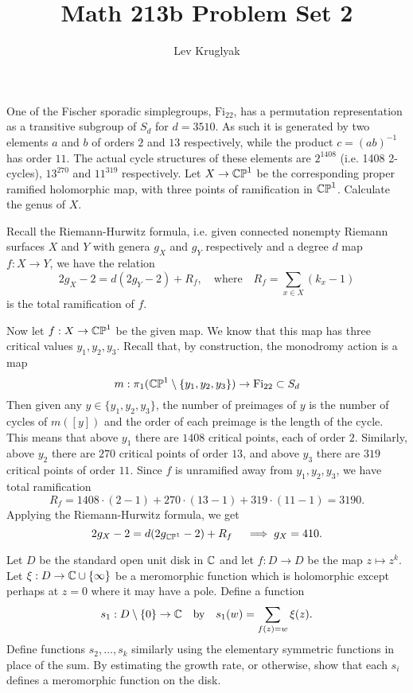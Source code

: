 \documentclass{lkx_pset}
\title{Math 213b Problem Set 2}
\author{Lev Kruglyak}
\begin{document}
\maketitle

\begin{problem}{1}
One of the Fischer sporadic simplegroups, $\mathrm{Fi}_{22}$, has a permutation representation as a transitive subgroup of $S_d$ for $d=3510$. As such it is generated by two elements $a$ and $b$ of orders $2$ and $13$ respectively, while the product $c=(ab)^{-1}$ has order $11$. The actual cycle structures of these elements are $2^{1408}$ (i.e. 1408 2-cycles), $13^{270}$ and $11^{319}$ respectively. Let $X \to \mathbb{CP}^1$ be the corresponding proper ramified holomorphic map, with three points of ramification in $\mathbb{CP}^1$. Calculate the genus of $X$.
\end{problem}

\begin{solution}
	Recall the Riemann-Hurwitz formula, i.e. given connected nonempty Riemann surfaces $X$ and $Y$ with genera $g_X$ and $g_Y$ respectively and a degree $d$ map $f: X \to Y$, we have the relation
	\[
		2g_X - 2 = d(2g_Y - 2) + R_f,\quad\textrm{where}\quad R_f = \sum_{x\in X} (k_x - 1)
	\]
	is the total ramification of $f$.

	Now let $f : X \to \mathbb{CP}^1$ be the given map. We know that this map has three critical values $y_1, y_2, y_3$. Recall that, by construction, the monodromy action is a map
	\[
		m : \pi_1(\mathbb{CP}^1\setminus \{y_1, y_2, y_3\}) \to \mathrm{Fi}_{22} \subset S_d
	\]
	Then given any $y\in \{y_1, y_2, y_3\}$, the number of preimages of $y$ is the number of cycles of $m([y])$ and the order of each preimage is the length of the cycle. This means that above $y_1$ there are $1408$ critical points, each of order $2$. Similarly, above $y_2$ there are $270$ critical points of order $13$, and above $y_3$ there are $319$ critical points of order $11$. Since $f$ is unramified away from $y_1, y_2, y_3$, we have total ramification
	\[
		R_f = 1408\cdot (2-1) + 270\cdot (13-1)+319\cdot (11-1) = 3190.\]
	Applying the Riemann-Hurwitz formula, we get \[2g_X - 2 = d(2g_{\mathbb{CP}^1}-2)+R_f\quad \implies g_X = 410.\]
\end{solution}

\begin{problem}{2}
Let $D$ be the standard open unit disk in $\mathbb{C}$ and let $f : D \to D$ be the map $z \mapsto z^k$. Let $\xi : D \to \mathbb{C}\cup \{\infty\}$ be a meromorphic function which is holomorphic except perhaps at $z=0$ where it may have a pole. Define a function
\[
	s_1 : D\setminus \{0\} \to \mathbb{C}\quad\textrm{by}\quad s_1(w) = \sum_{f(z)=w} \xi(z).
\]
Define functions $s_2, \ldots, s_k$ similarly using the elementary symmetric functions in place of the sum. By estimating the growth rate, or otherwise, show that each $s_i$ defines a meromorphic function on the disk.
\end{problem}
\end{document}
